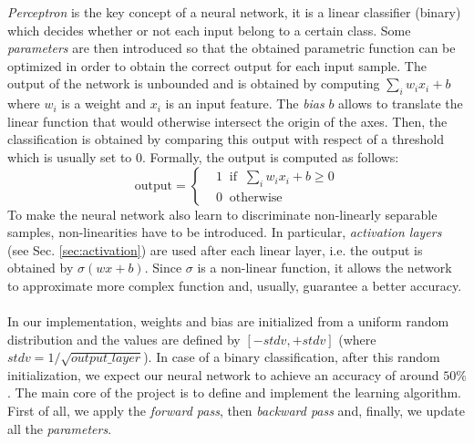 \documentclass[journal, a4paper]{IEEEtran}
\begin{document}
\textit{Perceptron} is the key concept of a neural network, it is a linear classifier (binary) which decides whether or not each input belong to a certain class. Some \textit{parameters} are then introduced so that the obtained parametric function can be optimized in order to obtain the correct output for each input sample. 
The output of the network is unbounded and is obtained by computing $\sum_i w_i x_i + b$ where $w_i$ is a weight and $x_i$ is an input feature. The \textit{bias} $b$ allows to translate the linear function that would otherwise intersect the origin of the axes. Then, the classification is obtained by comparing this output with respect of a threshold which is usually set to $0$. Formally, the output is computed as follows:
$$ \mbox{output} = \begin{cases}
     & 1 \;\; \mbox{if} \;\; \sum_i w_i x_i + b \geq 0 \\
     & 0 \;\; \mbox{otherwise}
\end{cases}$$
To make the neural network also learn to discriminate non-linearly separable samples, non-linearities have to be introduced. In particular, \textit{activation layers} (see Sec. \ref{sec:activation}) are used after each linear layer, i.e. the output is obtained by
$ \sigma (w x + b)$. Since $\sigma$ is a non-linear function, it allows the network to approximate more complex function and, usually, guarantee a better accuracy.
\\ \\
In our implementation, weights and bias are initialized from a uniform random distribution and the values are defined by $[-stdv, +stdv]$ (where $stdv = 1 / \sqrt{output\_layer}$). In case of a binary classification, after this random initialization, we expect our neural network to achieve an accuracy of around $50\%$. 
The main core of the project is to define and implement the learning algorithm. First of all, we apply the \textit{forward pass}, then \textit{backward pass} and, finally, we update all the \textit{parameters}.
\end{document}
